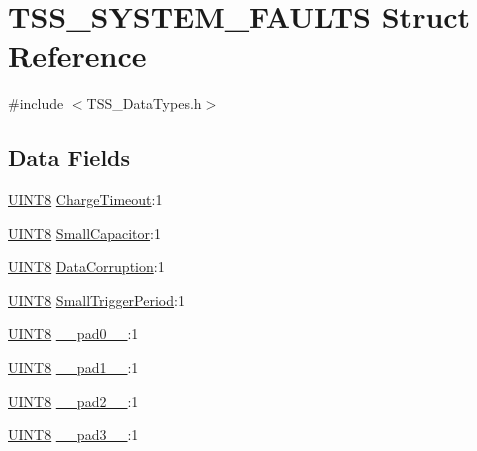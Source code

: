 \hypertarget{struct_t_s_s___s_y_s_t_e_m___f_a_u_l_t_s}{}\section{T\+S\+S\+\_\+\+S\+Y\+S\+T\+E\+M\+\_\+\+F\+A\+U\+L\+TS Struct Reference}
\label{struct_t_s_s___s_y_s_t_e_m___f_a_u_l_t_s}


{\ttfamily \#include $<$T\+S\+S\+\_\+\+Data\+Types.\+h$>$}

\subsection*{Data Fields}
\begin{DoxyCompactItemize}
\item 
\hyperlink{_t_s_s___data_types_8h_ab27e9918b538ce9d8ca692479b375b6a}{U\+I\+N\+T8} \hyperlink{struct_t_s_s___s_y_s_t_e_m___f_a_u_l_t_s_ae08634929e62d6223f25e1bda9dc0fe5}{Charge\+Timeout}\+:1
\item 
\hyperlink{_t_s_s___data_types_8h_ab27e9918b538ce9d8ca692479b375b6a}{U\+I\+N\+T8} \hyperlink{struct_t_s_s___s_y_s_t_e_m___f_a_u_l_t_s_aa202ca6af617906584b9241593df1926}{Small\+Capacitor}\+:1
\item 
\hyperlink{_t_s_s___data_types_8h_ab27e9918b538ce9d8ca692479b375b6a}{U\+I\+N\+T8} \hyperlink{struct_t_s_s___s_y_s_t_e_m___f_a_u_l_t_s_a0a78aa77420a8382084d8022e932dd97}{Data\+Corruption}\+:1
\item 
\hyperlink{_t_s_s___data_types_8h_ab27e9918b538ce9d8ca692479b375b6a}{U\+I\+N\+T8} \hyperlink{struct_t_s_s___s_y_s_t_e_m___f_a_u_l_t_s_a4b21973ca4b25a58eead1e0dbeddca3a}{Small\+Trigger\+Period}\+:1
\item 
\hyperlink{_t_s_s___data_types_8h_ab27e9918b538ce9d8ca692479b375b6a}{U\+I\+N\+T8} \hyperlink{struct_t_s_s___s_y_s_t_e_m___f_a_u_l_t_s_a2ee36fe5d196fb00b71d0929ff19fe04}{\+\_\+\+\_\+pad0\+\_\+\+\_\+}\+:1
\item 
\hyperlink{_t_s_s___data_types_8h_ab27e9918b538ce9d8ca692479b375b6a}{U\+I\+N\+T8} \hyperlink{struct_t_s_s___s_y_s_t_e_m___f_a_u_l_t_s_a0eafaa7e9e186548dc46e1de54292c9a}{\+\_\+\+\_\+pad1\+\_\+\+\_\+}\+:1
\item 
\hyperlink{_t_s_s___data_types_8h_ab27e9918b538ce9d8ca692479b375b6a}{U\+I\+N\+T8} \hyperlink{struct_t_s_s___s_y_s_t_e_m___f_a_u_l_t_s_ad558724ee7a063e9dc0fb2bd0b8f6635}{\+\_\+\+\_\+pad2\+\_\+\+\_\+}\+:1
\item 
\hyperlink{_t_s_s___data_types_8h_ab27e9918b538ce9d8ca692479b375b6a}{U\+I\+N\+T8} \hyperlink{struct_t_s_s___s_y_s_t_e_m___f_a_u_l_t_s_a9ebc0e06055925c052c452437df2a7b7}{\+\_\+\+\_\+pad3\+\_\+\+\_\+}\+:1
\end{DoxyCompactItemize}


